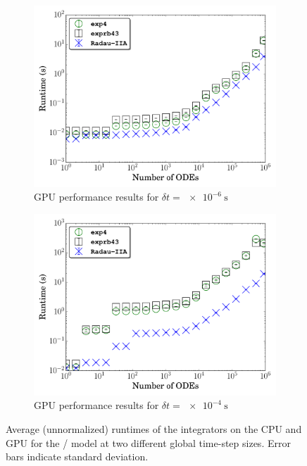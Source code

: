 \documentclass[preprint]{elsarticle}
\begin{document}
\begin{figure}[htb]
\begin{subfigure}{0.49\textwidth}
  \end{subfigure}\\
  \begin{subfigure}{0.49\textwidth}
      \includegraphics[width=\linewidth]{H2_1e-06_gpu_nonorm.pdf}
      \caption{GPU performance results for $\delta t = \SI{e-6}{\second}$}
  \end{subfigure}
  \begin{subfigure}{0.49\textwidth}
      \includegraphics[width=\linewidth]{H2_1e-04_gpu_nonorm.pdf}
      \caption{GPU performance results for $\delta t = \SI{e-4}{\second}$}
  \end{subfigure}
  \caption{Average (unnormalized) runtimes of the integrators on the CPU and GPU for the \slash{} model at two different global time-step sizes.
  Error bars indicate standard deviation.}
  \label{F:raw_perf_H2CO}
\end{figure}
\end{document}
